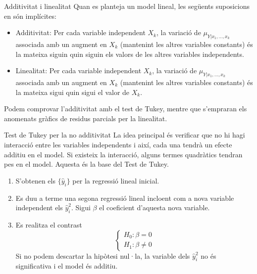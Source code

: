 \documentclass[12pt,t]{beamer}
\renewcommand{\emph}[1]{{\color{red}#1}}
\theoremstyle{plain}
\theoremstyle{definition}
\begin{document}
\begin{frame}{Additivitat i linealitat}
Quan es planteja un model lineal, les següents suposicions en són implícites:
\begin{itemize}
\item \emph{Additivitat}: Per cada variable independent $X_k$, la variació de $\mu_{Y|x_1,\ldots,x_k}$ associada amb un augment en $X_k$ (mantenint les altres variables constants) és la mateixa siguin quin siguin els valors de les altres variables independents.
\item \emph{Linealitat}:  Per cada variable independent $X_k$, la variació de $\mu_{Y|x_1,\ldots,x_k}$ associada amb un augment en $X_k$ (mantenint les altres variables constants) és la mateixa sigui quin sigui el valor de $X_k$.
\end{itemize}

Podem comprovar l'additivitat amb el test de Tukey, mentre que s'empraran els anomenats gràfics de residus parcials per la linealitat.

\end{frame}

\begin{frame}{Test de Tukey per la no additivitat}
La idea principal és verificar que no hi hagi interacció entre les variables independents i així, cada una tendrà un efecte additiu en el model. Si existeix la interacció, alguns termes quadràtics tendran pes en el model. Aquesta és la base del Test de Tukey.  
\begin{enumerate}
\item S'obtenen els $\{\hat{y}_i\}$ per la regressió lineal inicial.
\item Es duu a terme una segona regressió lineal incloent com a nova variable independent els $\hat{y}_i^2$. Sigui $\beta$ el coeficient d'aquesta nova variable.
\item Es realitza el contrast
$$\left\{\begin{array}{ll} H_0:  \beta=0\\ H_1: \beta\neq 0\end{array}\right.$$
Si no podem descartar la hipòtesi nul·la, la variable dels  $\hat{y}_i^2$ no és significativa i el model és additiu. 
\end{enumerate}

\end{frame}
\end{document}
